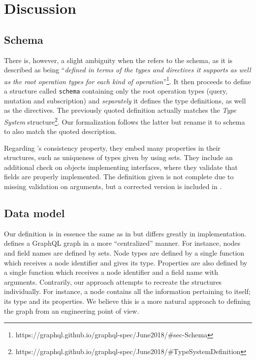 \section{Discussion}\label{sec:discussion}

\subsection{Schema}

There is, however, a slight ambiguity when the \spec{} refers to the schema, as it is described as being ``\textit{defined in terms of the types and directives it supports as well as the root operation types for each kind of operation}''\footnote{https://graphql.github.io/graphql-spec/June2018/\#sec-Schema}. It then proceeds to define a structure called \texttt{schema} containing only the root operation types (query, mutation and subscription) and \textit{separately} it defines the type definitions, as well as the directives. The previously quoted definition actually matches the \textit{Type System} structure\footnote{https://graphql.github.io/graphql-spec/June2018/\#TypeSystemDefinition}. Our formalization follows the latter but rename it to schema to also match the quoted description.

Regarding \HP{}'s consistency property, they embed many properties in their structures, such as uniqueness of types given by using sets. They include an additional check on objects implementing interfaces, where they validate that fields are properly implemented. The definition given is not complete due to missing validation on arguments, but a corrected version is included in \cite{olafschema}.

\subsection{Data model}


Our definition is in essence the same as in \HP{} but differs greatly in implementation. \HP{} defines a GraphQL graph in a more ``centralized'' manner. For instance, nodes and field names are defined by sets. Node types are defined by a single function which receives a node identifier and gives its type. Properties are also defined by a single function which receives a node identifier and a field name with arguments. Contrarily, our approach attempts to recreate the structures individually. For instance, a node contains all the information pertaining to itself; its type and its properties. We believe this is a more natural approach to defining the graph from an engineering point of view.


